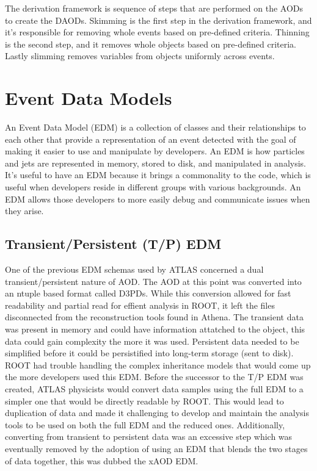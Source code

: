 The derivation framework is sequence of steps that are performed on the AODs to create the DAODs.
Skimming is the first step in the derivation framework, and it's responsible for removing whole events based on pre-defined criteria.
Thinning is the second step, and it removes whole objects based on pre-defined criteria.
Lastly slimming removes variables from objects uniformly across events. 


\section{Event Data Models}
An Event Data Model (EDM) is a collection of classes and their relationships to each other that provide a representation of an event detected with the goal of making it easier to use and manipulate by developers.
An EDM is how particles and jets are represented in memory, stored to disk, and manipulated in analysis.
It's useful to have an EDM because it brings a commonality to the code, which is useful when developers reside in different groups with various backgrounds.
An EDM allows those developers to more easily debug and communicate issues when they arise.  

\subsection{Transient/Persistent (T/P) EDM}
One of the previous EDM schemas used by ATLAS concerned a dual transient/persistent nature of AOD.
The AOD at this point was converted into an ntuple based format called D3PDs. 
While this conversion allowed for fast readability and partial read for effient analysis in ROOT, it left the files disconnected from the reconstruction tools found in Athena.\cite{Athena_xAOD_design}
The transient data was present in memory and could have information attatched to the object, this data could gain complexity the more it was used.
Persistent data needed to be simplified before it could be persistified into long-term storage (sent to disk). 
ROOT had trouble handling the complex inheritance models that would come up the more developers used this EDM. 
Before the successor to the T/P EDM was created, ATLAS physicists would convert data samples using the full EDM to a simpler one that would be directly readable by ROOT.
This would lead to duplication of data and made it challenging to develop and maintain the analysis tools to be used on both the full EDM and the reduced ones.
Additionally, converting from transient to persistent data was an excessive step which was eventually removed by the adoption of using an EDM that blends the two stages of data together, this was dubbed the xAOD EDM.




